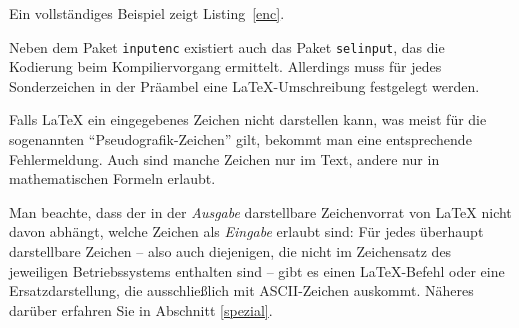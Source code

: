Ein vollständiges Beispiel zeigt Listing~\ref{enc}.

\begin{example}[caption={Festlegen von Font- und Eingabekodierung sowie des Fonts},label={enc}]
\usepackage[T1]{fontenc}
\usepackage[utf8]{inputenc}
\usepackage{lmodern} %
\end{example}

Neben dem Paket \texttt{inputenc} existiert auch das Paket \texttt{selinput}, das die Kodierung beim Kompiliervorgang ermittelt. Allerdings muss für jedes Sonderzeichen in der Präambel eine \LaTeX-Umschreibung festgelegt werden.

Falls \LaTeX{} ein eingegebenes Zeichen nicht darstellen kann, was meist für die
sogenannten "`Pseudografik-Zeichen"' gilt,  bekommt man eine entsprechende 
Fehlermeldung. Auch sind manche Zeichen nur im Text, andere nur in 
mathematischen Formeln erlaubt.

Man beachte, dass der in der \emph{Ausgabe} darstellbare Zeichenvorrat von 
\LaTeX{} nicht davon abhängt, welche Zeichen als \emph{Eingabe} erlaubt sind:
Für jedes überhaupt darstellbare Zeichen -- also auch diejenigen, die nicht im 
Zeichensatz des jeweiligen Betriebssystems enthalten sind -- gibt es einen 
\LaTeX-Befehl oder eine Ersatzdarstellung, die ausschließlich mit ASCII-Zeichen 
auskommt.  Näheres darüber erfahren Sie in Abschnitt \ref{spezial}.

\endinput
